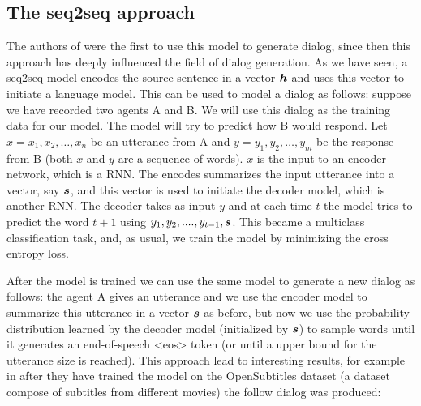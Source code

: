 \subsection{The seq2seq approach}

The authors of \cite{DBLP:journals/corr/VinyalsL15} were the first to use this model to generate dialog, since then this approach has deeply influenced the field of dialog generation. As we have seen, a seq2seq model encodes the source sentence in a vector $\bm{h}$ and uses this vector to initiate a language model. This can be used to model a dialog as follows: suppose we have recorded two agents A and B. We will use this dialog as the training data for our model. The model will try to predict how B would respond. Let $x = x_{1}, x_{2}, \dots, x_{n}$ be an utterance from A and $y = y_{1}, y_{2}, \dots, y_{m}$ be the response from B (both $x$ and $y$ are a sequence of words). $x$ is the input to an encoder network, which is a RNN. The encodes summarizes the input utterance into a vector, say $\bm{s}$, and this vector is used to initiate the decoder model, which is another RNN. The decoder takes as input $y$ and at each time $t$ the model tries to predict the word $t+1$ using $y_{1}, y_{2}, ...., y_{t-1}, \bm{s}$. This became a multiclass classification task, and, as usual, we train the model by minimizing the cross entropy loss.


After the model is trained we can use the same model to generate a new dialog as follows: the agent A gives an utterance and we use the encoder model to summarize this utterance in a vector $\bm{s}$ as before, but now we use the probability distribution learned by the decoder model (initialized by $\bm{s}$) to sample words until it generates an end-of-speech <eos> token (or until a upper bound for the utterance size is reached). This approach lead to interesting results, for example in \cite{DBLP:journals/corr/VinyalsL15} after they have trained the model on the OpenSubtitles dataset (a dataset compose of subtitles from different movies) the follow dialog was produced:

